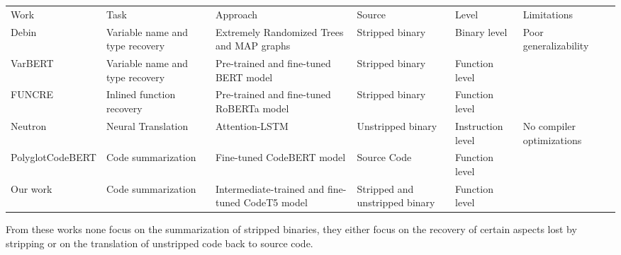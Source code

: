 \begin{table}[!h]
\begin{sideways}
\begin{tabulary}{1.5\textwidth}{lLLLLL}
Work     & Task                            & Approach                                           & Source                         & Level             & Limitations               \\
Debin    & Variable name and type recovery & Extremely Randomized Trees and MAP graphs           & Stripped binary                & Binary level      & Poor generalizability     \\
VarBERT  & Variable name and type recovery & Pre-trained and fine-tuned BERT model              & Stripped binary                & Function level    &                           \\
FUNCRE   & Inlined function recovery       & Pre-trained and fine-tuned RoBERTa model           & Stripped binary                & Function level    &                           \\
Neutron  & Neural Translation              & Attention-LSTM                                     & Unstripped binary              & Instruction level & No compiler optimizations \\ 
PolyglotCodeBERT & Code summarization       & Fine-tuned CodeBERT model   & Source Code & Function level    &   \\
Our work & Code summarization              & Intermediate-trained and fine-tuned CodeT5 model   & Stripped and unstripped binary & Function level    &   \\

\end{tabulary}
\end{sideways}
\end{table}

From these works none focus on the summarization of stripped binaries, they either focus on the recovery of certain aspects lost by stripping or on the translation of unstripped code back to source code. 
